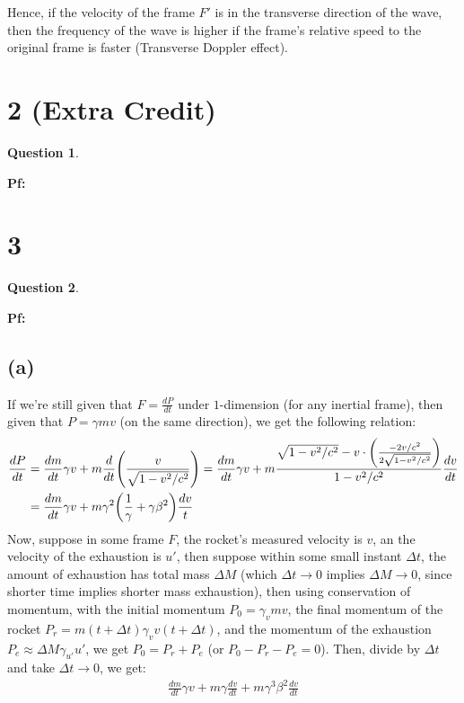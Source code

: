 \documentclass{article}
\newtheorem{question}{Question}
\DeclarePairedDelimiter{\paran}{(}{)}%
\begin{document}
Hence, if the velocity of the frame $F'$ is in the transverse direction of the wave, then the frequency of the wave is higher if the frame's relative speed to the original frame is faster (Transverse Doppler effect).

\break

\section*{2 (Extra Credit)}
\begin{question}\label{q2}
\end{question}

\textbf{Pf:}


\break

\section*{3}
\begin{question}\label{q3}
\end{question}

\textbf{Pf:}
\subsection*{(a)}
If we're still given that $F = \frac{dP}{dt}$ under $1$-dimension (for any inertial frame), then given that $P = \gamma mv$ (on the same direction), we get the following relation: 
\begin{align}
    \frac{dP}{dt} &= \frac{dm}{dt} \gamma v + m \frac{d}{dt}\paran*{\frac{v}{\sqrt{1-v^2/c^2}}} = \frac{dm}{dt}\gamma v + m\frac{\sqrt{1-v^2/c^2} - v\cdot \paran*{\frac{-2v/c^2}{2\sqrt{1-v^2/c^2}}}}{1-v^2/c^2}\frac{dv}{dt}\\
    &= \frac{dm}{dt}\gamma v + m\gamma^2\paran*{\frac{1}{\gamma}+\gamma\beta^2}\frac{dv}{t}
\end{align}
Now, suppose in some frame $F$, the rocket's measured velocity is $v$, an the velocity of the exhaustion is $u'$, then suppose within some small instant $\Delta t$, the amount of exhaustion has total mass $\Delta M$ (which $\Delta t\rightarrow 0$ implies $\Delta M\rightarrow 0$, since shorter time implies shorter mass exhaustion), then using conservation of momentum, with the initial momentum $P_0 = \gamma_v mv$, the final momentum of the rocket $P_r = m(t+\Delta t) \gamma_v v(t+\Delta t)$, and the momentum of the exhaustion $P_e \approx \Delta M \gamma_{u'}u'$, we get $P_0 = P_r+P_e$ (or $P_0-P_r-P_e = 0$). Then, divide by $\Delta t$ and take $\Delta t\rightarrow 0$, we get:
\begin{align}
    \frac{dm}{dt}\gamma v+m\gamma \frac{dv}{dt} + m\gamma^3\beta^2\frac{dv}{dt}
\end{align}
\end{document}
